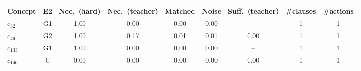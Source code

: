 \begin{tabular}{lcccccccc}
\toprule
Concept & E2 & Nec.\ (hard) & Nec.\ (teacher) & Matched & Noise & Suff.\ (teacher) & \#clauses & \#actions \\
\midrule
$c_{32}$ & G1 & 1.00 & 0.00 & 0.00 & 0.00 & -- & 1 & 1 \\
$c_{49}$ & G2 & 1.00 & 0.17 & 0.01 & 0.01 & 0.00 & 1 & 1 \\
$c_{133}$ & G1 & 1.00 & 0.00 & 0.00 & 0.00 & -- & 1 & 1 \\
$c_{146}$ & U & 0.00 & 0.00 & 0.00 & 0.00 & 0.00 & 1 & 1 \\
\bottomrule
\end{tabular}